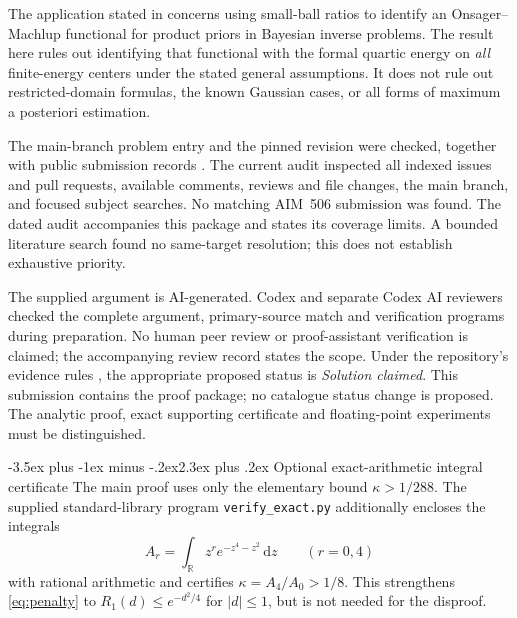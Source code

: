 \documentclass[11pt]{article}
\makeatletter
\renewcommand{\section}{\@startsection{section}{1}{0pt}
  {-3.5ex plus -1ex minus -.2ex}{2.3ex plus .2ex}
  {\normalfont\large\bfseries\color{MidnightBlue}}}
\theoremstyle{remark}
\newcommand{\R}{\mathbb R}
\newcommand{\dd}{\,\mathrm d}
\newcommand{\code}[1]{\texttt{#1}}
\makeatother
\begin{document}
The application stated in \cite{aim506,AKLS} concerns using small-ball ratios to identify an Onsager--Machlup functional for product priors in Bayesian inverse problems. The result here rules out identifying that functional with the formal quartic energy on \emph{all} finite-energy centers under the stated general assumptions. It does not rule out restricted-domain formulas, the known Gaussian cases, or all forms of maximum a posteriori estimation.

The main-branch problem entry and the pinned revision were checked, together with public submission records \cite{prs}. The current audit inspected all indexed issues and pull requests, available comments, reviews and file changes, the main branch, and focused subject searches. No matching AIM~506 submission was found. The dated audit accompanies this package and states its coverage limits. A bounded literature search found no same-target resolution; this does not establish exhaustive priority.

The supplied argument is AI-generated. Codex and separate Codex AI reviewers checked the complete argument, primary-source match and verification programs during preparation. No human peer review or proof-assistant verification is claimed; the accompanying review record states the scope. Under the repository's evidence rules \cite{contributing}, the appropriate proposed status is \emph{Solution claimed}. This submission contains the proof package; no catalogue status change is proposed. The analytic proof, exact supporting certificate and floating-point experiments must be distinguished.

\appendix
\section{Optional exact-arithmetic integral certificate}\label{app:exact}
The main proof uses only the elementary bound $\kappa>1/288$. The supplied standard-library program \code{verify\_exact.py} additionally encloses the integrals
\[
A_r=\int_\R z^r e^{-z^4-z^2}\dd z\qquad(r=0,4)
\]
with rational arithmetic and certifies $\kappa=A_4/A_0>1/8$. This strengthens \eqref{eq:penalty} to $R_1(d)\le e^{-d^2/4}$ for $|d|\le1$, but is not needed for the disproof.
\end{document}
